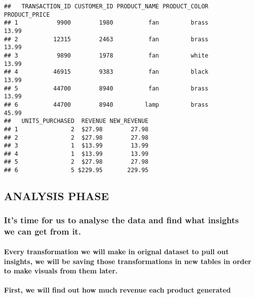\documentclass[
]{article}
\begin{document}
\begin{verbatim}
##   TRANSACTION_ID CUSTOMER_ID PRODUCT_NAME PRODUCT_COLOR PRODUCT_PRICE
## 1           9900        1980          fan         brass         13.99
## 2          12315        2463          fan         brass         13.99
## 3           9890        1978          fan         white         13.99
## 4          46915        9383          fan         black         13.99
## 5          44700        8940          fan         brass         13.99
## 6          44700        8940         lamp         brass         45.99
##   UNITS_PURCHASED  REVENUE NEW_REVENUE
## 1               2  $27.98        27.98
## 2               2  $27.98        27.98
## 3               1  $13.99        13.99
## 4               1  $13.99        13.99
## 5               2  $27.98        27.98
## 6               5 $229.95       229.95
\end{verbatim}

\hypertarget{analysis-phase}{%
\subsection{ANALYSIS PHASE}\label{analysis-phase}}

\hypertarget{its-time-for-us-to-analyse-the-data-and-find-what-insights-we-can-get-from-it.}{%
\subsubsection{It's time for us to analyse the data and find what
insights we can get from
it.}\label{its-time-for-us-to-analyse-the-data-and-find-what-insights-we-can-get-from-it.}}

\hypertarget{every-transformation-we-will-make-in-orignal-dataset-to-pull-out-insights-we-will-be-saving-those-transformations-in-new-tables-in-order-to-make-visuals-from-them-later.}{%
\paragraph{Every transformation we will make in orignal dataset to pull
out insights, we will be saving those transformations in new tables in
order to make visuals from them
later.}\label{every-transformation-we-will-make-in-orignal-dataset-to-pull-out-insights-we-will-be-saving-those-transformations-in-new-tables-in-order-to-make-visuals-from-them-later.}}

\hypertarget{first-we-will-find-out-how-much-revenue-each-product-generated}{%
\paragraph{First, we will find out how much revenue each product
generated}\label{first-we-will-find-out-how-much-revenue-each-product-generated}}
\end{document}
